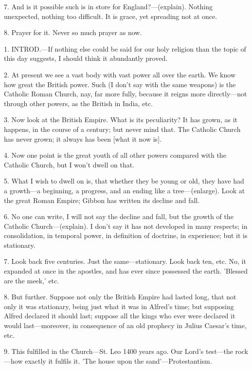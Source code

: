 7. And is it possible such is in store for
England?—(explain). Nothing unexpected, nothing too difficult. It is
grace, yet spreading not at once.

8. Prayer for it. Never so much prayer as now.


1. INTROD.—If
nothing else could be said for our holy religion than the topic of
this day suggests, I should think it abundantly proved.

2. At present we see a vast body with vast power
all over the earth. We know how great the British power. Such (I don't
say with the same weapons) is the Catholic Roman Church, nay, far more
fully, because it reigns more directly—not through other powers, as
the British in India, etc.

3. Now look at the British Empire. What is its
peculiarity? It has grown, as it happens, in the course of a century;
but never mind that. The Catholic Church has never grown; it always
has been [what it now is].

4. Now one point is the great youth of all other
powers compared with the Catholic Church, but I won't dwell on that.

5. What I wish to dwell on is, that whether they
be young or old, they have had a growth—a beginning, a progress, and
an ending like a tree—(enlarge). Look at the great Roman Empire;
Gibbon has written its decline and fall.

6. No one can write, I will not say the decline
and fall, but the growth of the Catholic Church—(explain). I don't
say it has not developed in many respects; in consolidation, in
temporal power, in definition of doctrine, in experience; but it is
stationary.

7. Look back five centuries. Just the
same—stationary. Look back ten, etc. No, it expanded at once in the
apostles, and has ever since possessed the earth. 'Blessed are the
meek,' etc.

8. But further. Suppose not only the British
Empire had lasted long, that not only it was stationary, being just
what it was in Alfred's time; but supposing Alfred declared it should
last; suppose all the kings who ever were declared it would
last—moreover, in consequence of an old prophecy in Julius Caesar's
time, etc.

9. This fulfilled in the Church—St. Leo 1400
years ago. Our Lord's test—the rock—how exactly it fulfils it.
'The house upon the sand'—Protestantism.

